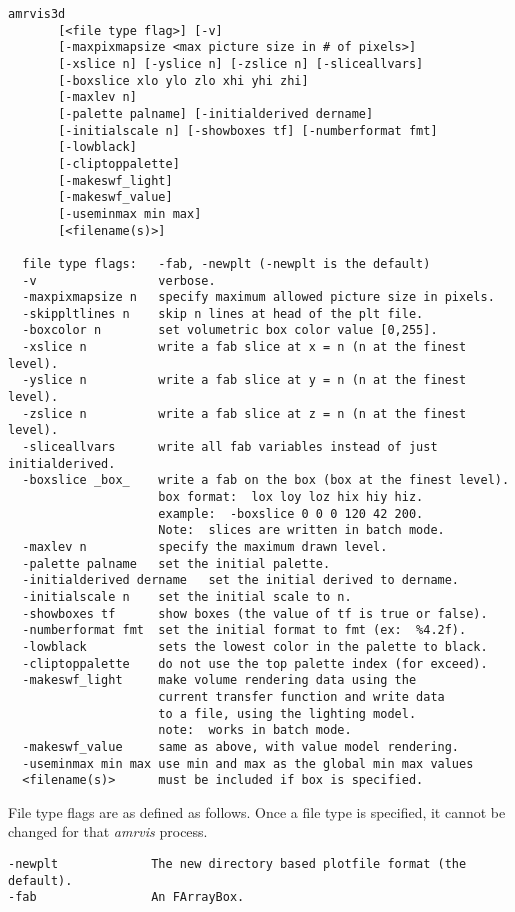 \begin{verbatim}
amrvis3d
       [<file type flag>] [-v]
       [-maxpixmapsize <max picture size in # of pixels>]
       [-xslice n] [-yslice n] [-zslice n] [-sliceallvars]
       [-boxslice xlo ylo zlo xhi yhi zhi]
       [-maxlev n]
       [-palette palname] [-initialderived dername]
       [-initialscale n] [-showboxes tf] [-numberformat fmt]
       [-lowblack]
       [-cliptoppalette]
       [-makeswf_light]
       [-makeswf_value]
       [-useminmax min max]
       [<filename(s)>]

  file type flags:   -fab, -newplt (-newplt is the default)
  -v                 verbose.
  -maxpixmapsize n   specify maximum allowed picture size in pixels.
  -skippltlines n    skip n lines at head of the plt file.
  -boxcolor n        set volumetric box color value [0,255].
  -xslice n          write a fab slice at x = n (n at the finest level).
  -yslice n          write a fab slice at y = n (n at the finest level).
  -zslice n          write a fab slice at z = n (n at the finest level).
  -sliceallvars      write all fab variables instead of just initialderived.
  -boxslice _box_    write a fab on the box (box at the finest level).
                     box format:  lox loy loz hix hiy hiz.
                     example:  -boxslice 0 0 0 120 42 200.
                     Note:  slices are written in batch mode.
  -maxlev n          specify the maximum drawn level.
  -palette palname   set the initial palette.
  -initialderived dername   set the initial derived to dername.
  -initialscale n    set the initial scale to n.
  -showboxes tf      show boxes (the value of tf is true or false).
  -numberformat fmt  set the initial format to fmt (ex:  %4.2f).
  -lowblack          sets the lowest color in the palette to black.
  -cliptoppalette    do not use the top palette index (for exceed).
  -makeswf_light     make volume rendering data using the
                     current transfer function and write data
                     to a file, using the lighting model.
                     note:  works in batch mode.
  -makeswf_value     same as above, with value model rendering.
  -useminmax min max use min and max as the global min max values
  <filename(s)>      must be included if box is specified.
\end{verbatim}


File type flags are as defined as follows.  Once a file type is specified,
it cannot be changed for that {\em amrvis} process.

\begin{verbatim}
-newplt             The new directory based plotfile format (the default).
-fab                An FArrayBox.
\end{verbatim}


